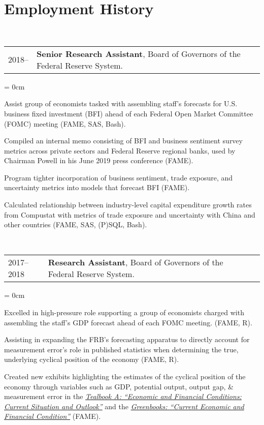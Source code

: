 \documentclass[a4paper, 11pt]{article}
\begin{document}
  \section{Employment History}
    ~\begin{tabular}{llP{15cm}}
      2018-- & \textbf{Senior Research Assistant}, Board of Governors of the Federal Reserve System.
    \end{tabular}

    \begin{compactitem}\parskip = 0cm
      \item Assist group of economists tasked with assembling staff's forecasts for U.S. business fixed investment (BFI) ahead of each Federal Open Market Committee (FOMC) meeting (FAME, SAS, Bash).
      \item Compiled an internal memo consisting of BFI and business sentiment survey metrics across private sectors and Federal Reserve regional banks, used by Chairman Powell in his June 2019 press conference (FAME).
      \item Program tighter incorporation of business sentiment, trade exposure, and uncertainty metrics into models that forecast BFI (FAME).
      \item Calculated relationship between industry-level capital expenditure growth rates from Compustat with metrics of trade exposure and uncertainty with China and other countries (FAME, SAS, (P)SQL, Bash).
    \end{compactitem}

    \vspace*{1em}

    ~\begin{tabular}{llP{15cm}}
      2017--2018 & \textbf{Research Assistant}, Board of Governors of the Federal Reserve System.
    \end{tabular}

    \begin{compactitem}\parskip = 0cm
      \item Excelled in high-pressure role supporting a group of economists charged with assembling the staff's GDP forecast ahead of each FOMC meeting. (FAME, R).
      \item Assisting in expanding the FRB's forecasting apparatus to directly account for measurement error's role in published statistics when determining the true, underlying cyclical position of the economy (FAME, R).
      \item Created new exhibits highlighting the estimates of the cyclical position of the economy through variables such as GDP, potential output, output gap, \& measurement error in the \href{https://www.federalreserve.gov/monetarypolicy/fomc_historical.htm#tealbooks}{\textit{Tealbook A: ``Economic and Financial Conditions: Current Situation and Outlook''}} and the \href{https://www.federalreserve.gov/monetarypolicy/fomc_historical.htm#greenbooks}{\textit{Greenbooks: ``Current Economic and Financial Condition''}} (FAME).
    \end{compactitem}
\end{document}
